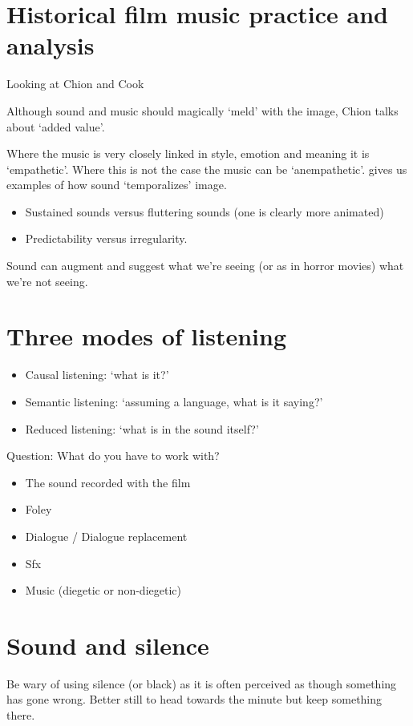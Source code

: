 \section{Historical film music practice and analysis}

Looking at Chion \citeyearpar{chion1990} and Cook \citeyearpar{cook1998analysing}

Although sound and music should magically `meld' with the image, Chion talks about `added value'. 

Where the music is very closely linked in style, emotion and meaning it is `empathetic'. Where this is not the case the music can be `anempathetic'. 
\citep[14-15]{chion1990} gives us examples of how sound `temporalizes' image.
\begin{itemize}
\item Sustained sounds versus fluttering sounds (one is clearly more animated)
\item Predictability versus irregularity. 
\end{itemize}

Sound can augment and suggest what we're seeing (or as in horror movies) what we're not seeing. 

\section{Three modes of listening}
\begin{itemize}
\item Causal listening: `what is it?'
\item Semantic listening: `assuming a language, what is it saying?'
\item Reduced listening: `what is in the sound itself?'
\end{itemize}

Question: What do you have to work with?
\begin{itemize}
\item The sound recorded with the film
\item Foley
\item Dialogue / Dialogue replacement
\item Sfx
\item Music (diegetic or non-diegetic)
\end{itemize}

\section{Sound and silence}
Be wary of using silence (or black) as it is often perceived as though something has gone wrong. Better still to head towards the minute but keep something there.

